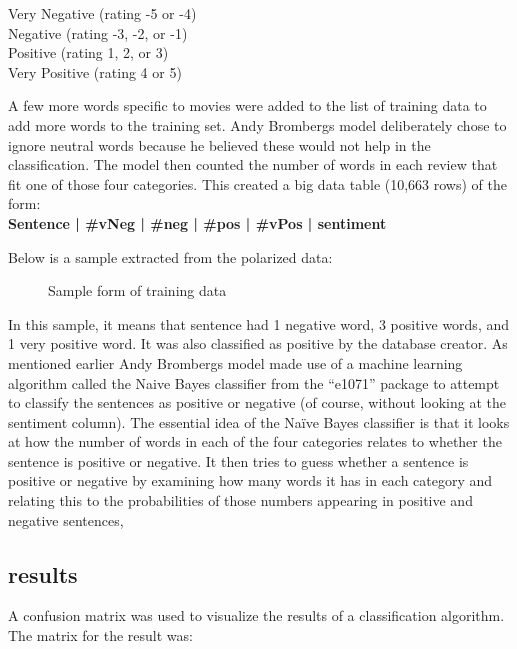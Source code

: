 \begin{center}


Very Negative (rating -5 or -4)\\
Negative (rating -3, -2, or -1)\\
Positive (rating 1, 2, or 3)\\
Very Positive (rating 4 or 5)

\end{center}

A few more words specific to movies were added to the list of training data to add more words to
the training set. Andy Bromberg\textquotesingle s model deliberately chose to ignore neutral words because he believed these would not help in the classification. The model then counted the number of words in each review that fit one of those four categories. This created a big data table (10,663 rows) of the form: \leavevmode\\
\textbf{
Sentence | \#vNeg | \#neg | \#pos | \#vPos | sentiment
}

Below is a sample extracted from the polarized data:
\begin{figure}[h]
  \centering
  \caption[Vector graphics example]%
  {Sample form of training data}
  \label{fig:ALAP:sm3}
\end{figure}


In this sample, it means that sentence had 1 negative word, 3 positive words, and 1 very positive
word. It was also classified as positive by the database creator.
As mentioned earlier Andy Bromberg\textquotesingle s model made use of a machine learning algorithm called
the Naive Bayes classifier from the “e1071” package to attempt to classify the sentences as positive
or negative (of course, without looking at the sentiment column).
The essential idea of the Naïve Bayes classifier is that it looks at how the number of words in each
of the four categories relates to whether the sentence is positive or negative. It then tries to guess
whether a sentence is positive or negative by examining how many words it has in each category
and relating this to the probabilities of those numbers appearing in positive and negative sentences,
\cite{ref31}

\clearpage
\subsection{results}

A confusion matrix was used to visualize the results of a classification algorithm. The matrix for
the result was:

